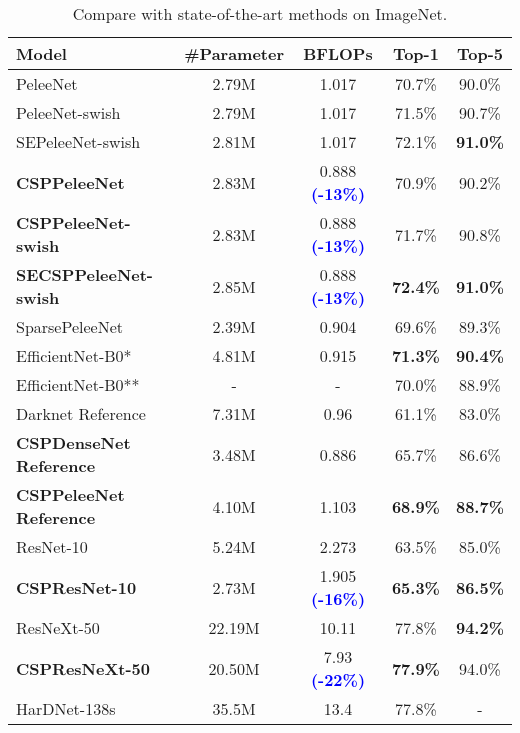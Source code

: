 \documentclass{article}
\begin{document}
\begin{table}[h]
	\centering
	\begin{threeparttable}[h]
		\footnotesize
\caption{Compare with state-of-the-art methods on ImageNet.}
		\label{table:imagenet}
		\setlength\tabcolsep{2.0pt}
		\begin{tabular}{lcccc}
			\toprule
			Model & \#Parameter & BFLOPs & Top-1 & Top-5 \\			
			\midrule	
			\midrule
			PeleeNet \cite{wang2018pelee} & 2.79M & 1.017 & 70.7\% & 90.0\% \\	
			PeleeNet-swish & 2.79M & 1.017 & 71.5\% & 90.7\% \\
			SEPeleeNet-swish & 2.81M & 1.017 & 72.1\% & \textbf{91.0\%} \\
			\textbf{CSPPeleeNet} & 2.83M & 0.888 \textbf{\textcolor{blue}{(-13\%)}} & 70.9\%  & 90.2\% \\	
			\textbf{CSPPeleeNet-swish} & 2.83M & 0.888 \textbf{\textcolor{blue}{(-13\%)}} & 71.7\% & 90.8\% \\
			\textbf{SECSPPeleeNet-swish} & 2.85M & 0.888 \textbf{\textcolor{blue}{(-13\%)}} & \textbf{72.4\%} & \textbf{91.0\%} \\
			SparsePeleeNet \cite{zhu2018sparsely} & 2.39M & 0.904 & 69.6\% & 89.3\% \\
			\midrule	
			EfficientNet-B0* \cite{tan2019efficientnet} & 4.81M  & 0.915 & \textbf{71.3\%} & \textbf{90.4\%} \\
			EfficientNet-B0** \cite{tan2019efficientnet} & -  & - & 70.0\% & 88.9\% \\
			\midrule
			Darknet Reference \cite{darknet13} & 7.31M & 0.96 & 61.1\% & 83.0\% \\
\textbf{CSPDenseNet Reference} & 3.48M & 0.886 & 65.7\% & 86.6\% \\
			\textbf{CSPPeleeNet Reference} & 4.10M & 1.103 & \textbf{68.9\%} & \textbf{88.7\%} \\
			\midrule
			ResNet-10 \cite{he2016deep} & 5.24M & 2.273 & 63.5\% & 85.0\% \\
			\textbf{CSPResNet-10} & 2.73M & 1.905 \textbf{\textcolor{blue}{(-16\%)}} & \textbf{65.3\%} & \textbf{86.5\%} \\
			\midrule
			ResNeXt-50 \cite{xie2017aggregated} & 22.19M & 10.11 & 77.8\%  & \textbf{94.2\%} \\
			\textbf{CSPResNeXt-50} & 20.50M & 7.93 \textbf{\textcolor{blue}{(-22\%)}} & \textbf{77.9\%} & 94.0\% \\
			HarDNet-138s \cite{chao2019hardnet} & 35.5M & 13.4 & 77.8\% & - \\

\end{tabular}
\end{threeparttable}
\end{table}
\end{document}
